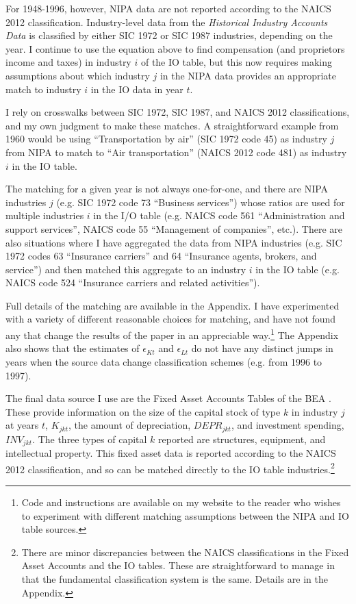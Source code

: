 \documentclass[11pt]{article}
\begin{document}
For 1948-1996, however, NIPA data are not reported according to the NAICS 2012 classification. Industry-level data from the \textit{Historical Industry Accounts Data} \citep{beahistind} is classified by either SIC 1972 or SIC 1987 industries, depending on the year. I continue to use the equation above to find compensation (and proprietors income and taxes) in industry $i$ of the IO table, but this now requires making assumptions about which industry $j$ in the NIPA data provides an appropriate match to industry $i$ in the IO data in year $t$.

I rely on crosswalks between SIC 1972, SIC 1987, and NAICS 2012 classifications, and my own judgment to make these matches. A straightforward example from 1960 would be using ``Transportation by air'' (SIC 1972 code 45) as industry $j$ from NIPA to match to ``Air transportation'' (NAICS 2012 code 481) as industry $i$ in the IO table.

The matching for a given year is not always one-for-one, and there are NIPA industries $j$ (e.g. SIC 1972 code 73 ``Business services'') whose ratios are used for multiple industries $i$ in the I/O table (e.g. NAICS code 561 ``Administration and support services'', NAICS code 55 ``Management of companies'', etc.). There are also situations where I have aggregated the data from NIPA industries (e.g. SIC 1972 codes 63 ``Insurance carriers'' and 64 ``Insurance agents, brokers, and service'') and then matched this aggregate to an industry $i$ in the IO table (e.g. NAICS code 524 ``Insurance carriers and related activities''). 

Full details of the matching are available in the Appendix. I have experimented with a variety of different reasonable choices for matching, and have not found any that change the results of the paper in an appreciable way.\footnote{Code and instructions are available on my website to the reader who wishes to experiment with different matching assumptions between the NIPA and IO table sources.} The Appendix also shows that the estimates of $\epsilon_{Kt}$ and $\epsilon_{Lt}$ do not have any distinct jumps in years when the source data change classification schemes (e.g. from 1996 to 1997). 

The final data source I use are the Fixed Asset Accounts Tables of the BEA \citep{beacap,beagov}. These provide information on the size of the capital stock of type $k$ in industry $j$ at years $t$, $K_{jkt}$, the amount of depreciation, $DEPR_{jkt}$, and investment spending, $INV_{jkt}$. The three types of capital $k$ reported are structures, equipment, and intellectual property. This fixed asset data is reported according to the NAICS 2012 classification, and so can be matched directly to the IO table industries.\footnote{There are minor discrepancies between the NAICS classifications in the Fixed Asset Accounts and the IO tables. These are straightforward to manage in that the fundamental classification system is the same. Details are in the Appendix.} 
\end{document}
